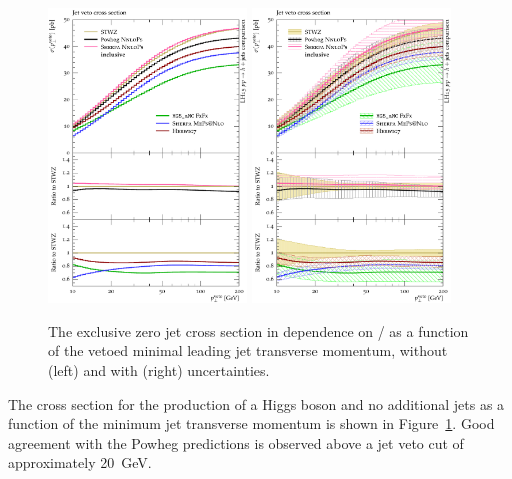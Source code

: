 \begin{figure}[t!]
  \centering
  \includegraphics[width=0.47\textwidth]{figures/hjetscomp_u_xs_jet_veto_j0.pdf}
  \hfill
  \includegraphics[width=0.47\textwidth]{figures/hjetscomp_xs_jet_veto_j0.pdf}
  \caption{
    The exclusive zero jet cross section in dependence on / as a
    function of the vetoed minimal leading jet transverse momentum,
    without (left) and with (right) uncertainties.
    \label{fig:higgscomp:results:jvobs:jvxs0}
  }
\end{figure}

The cross section for the production of a Higgs boson and no
additional jets as a function of the minimum jet transverse momentum
is shown in Figure~\ref{fig:higgscomp:results:jvobs:jvxs0}. Good
agreement with the Powheg predictions is observed above a jet veto cut
of approximately 20~GeV.


